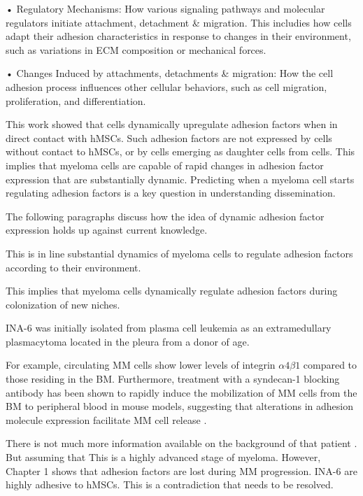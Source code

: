 • Regulatory Mechanisms: How various signaling pathways and molecular regulators
initiate attachment, detachment \& migration. This includies how cells adapt
their adhesion characteristics in response to changes in their environment, such
as variations in ECM composition or mechanical forces.

• Changes Induced by attachments, detachments \& migration: How the cell
adhesion process influences other cellular behaviors, such as cell migration,
proliferation, and differentiation.


This work showed that \INA cells dynamically upregulate adhesion factors when in
direct contact with \acp{hMSC}. Such adhesion factors are not expressed by \INA
cells without contact to \acp{hMSC}, or by \INA cells emerging as daughter cells
from \MAina cells. This implies that myeloma cells are capable of rapid changes in
adhesion factor expression that are substantially dynamic.
Predicting when a myeloma cell starts regulating adhesion factors is a key
question in understanding dissemination.

The following paragraphs
discuss how the idea of dynamic adhesion factor expression holds up
against current knowledge.



This is in line
substantial dynamics of
myeloma cells to regulate adhesion factors according to their environment.



This implies that myeloma cells
dynamically regulate adhesion factors during colonization of new niches.




INA-6 was initially isolated from plasma cell leukemia as an extramedullary
plasmacytoma located in the pleura from a donor of age.





For example,
circulating MM cells show lower levels of integrin $\alpha4\beta1$
compared to those residing in the BM. Furthermore, treatment with a syndecan-1 blocking antibody
has been shown to rapidly induce the mobilization of MM cells from the BM to
peripheral blood in mouse models, suggesting that alterations in adhesion
molecule expression facilitate MM cell release
\cite{zeissigTumourDisseminationMultiple2020}.



There is not much more information available on the background of that patient \cite{TwoNewInterleukin6,burgerGp130RasMediated2001}.
But assuming that
This is a highly advanced
stage of myeloma.
However,  Chapter 1 shows that adhesion factors are
lost during MM progression. INA-6 are highly adhesive to hMSCs.
This is a contradiction that needs to be resolved.





